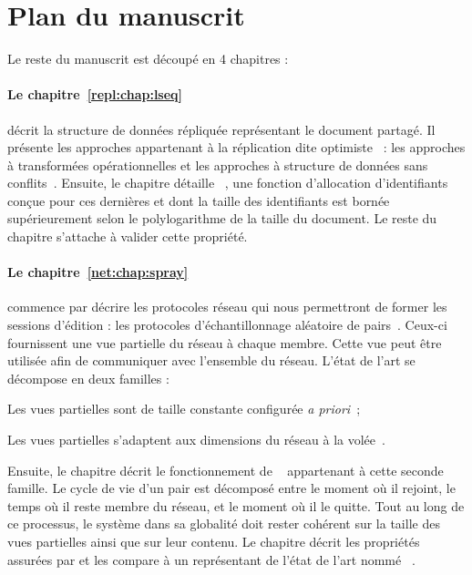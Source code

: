 
\section{Plan du manuscrit}

Le reste du manuscrit est découpé en 4 chapitres :

\paragraph{Le chapitre~\ref{repl:chap:lseq}} décrit la structure de données
répliquée représentant le document partagé. Il présente les approches
appartenant à la réplication dite optimiste~\cite{demers1987epidemic,
  saito2005optimistic} : les approches à transformées opérationnelles et les
approches à structure de données sans conflits~\cite{burckhardt2014replicated,
  shapiro2011conflict}. Ensuite, le chapitre détaille
\LSEQ~\cite{nedelec2013concurrency, nedelec2013lseq}, une fonction d'allocation
d'identifiants conçue pour ces dernières et dont la taille des identifiants est
bornée supérieurement selon le polylogarithme de la taille du document. Le reste
du chapitre s'attache à valider cette propriété.

\paragraph{Le chapitre~\ref{net:chap:spray}} commence par décrire les
protocoles réseau qui nous permettront de former les sessions d'édition : les
protocoles d'échantillonnage aléatoire de pairs~\cite{jelasity2004peer,
  jelasity2007gossip}. Ceux-ci fournissent une vue partielle du réseau à chaque
membre. Cette vue peut être utilisée afin de communiquer avec l'ensemble du
réseau. L'état de l'art se décompose en deux familles :
\begin{inparaenum}[(i)]
\item Les vues partielles sont de taille constante configurée \emph{a
    priori}~\cite{eugster2003lightweight, jelasity2007gossip,
    leitao2007dependable, tolgyeski2009adaptive, voulgaris2005cyclon};
\item Les vues partielles s'adaptent aux dimensions du réseau à la
  volée~\cite{ganesh2001scamp, ganesh2003peer}.
\end{inparaenum}
Ensuite, le chapitre décrit le fonctionnement de \SPRAY~\cite{nedelec2015spray}
appartenant à cette seconde famille. Le cycle de vie d'un pair est décomposé
entre le moment où il rejoint, le temps où il reste membre du réseau, et le
moment où il le quitte. Tout au long de ce processus, le système dans sa
globalité doit rester cohérent sur la taille des vues partielles ainsi que sur
leur contenu.  Le chapitre décrit les propriétés assurées par \SPRAY et les
compare à un représentant de l'état de l'art nommé
\CYCLON~\cite{voulgaris2005cyclon}.

